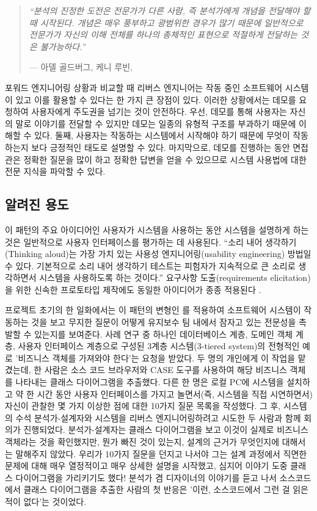 \documentclass[a4paper,10pt,twoside]{book}
\begin{document}
\begin{quotation}
\noindent
\emph{``분석의 진정한 도전은 전문가가 다른 사람, 즉 분석가에게 개념을 전달해야 할 때 시작된다. 개념은 매우 풍부하고 광범위한 경우가 많기 때문에 일반적으로 전문가가 자신의 이해 전체를 하나의 총체적인 표현으로 적절하게 전달하는 것은 불가능하다.''}

\hfill --- 아델 골드버그, 케니 루빈, \cite{Gold95a}
\end{quotation}

포워드 엔지니어링 상황과 비교할 때 리버스 엔지니어는 작동 중인 소프트웨어 시스템이 있고 이를 활용할 수 있다는 한 가지 큰 장점이 있다. 이러한 상황에서는 데모를 요청하여 사용자에게 주도권을 넘기는 것이 안전하다. 우선, 데모를 통해 사용자는 자신의 말로 이야기를 전달할 수 있지만 데모는 일종의 유형적 구조를 부과하기 때문에 이해할 수 있다. 둘째, 사용자는 작동하는 시스템에서 시작해야 하기 때문에 무엇이 작동하는지 보다 긍정적인 태도로 설명할 수 있다. 마지막으로, 데모를 진행하는 동안 면접관은 정확한 질문을 많이 하고 정확한 답변을 얻을 수 있으므로 시스템 사용법에 대한 전문 지식을 파악할 수 있다.

\subsection*{알려진 용도}

이 패턴의 주요 아이디어인 사용자가 시스템을 사용하는 동안 시스템을 설명하게 하는 것은 일반적으로 사용자 인터페이스를 평가하는 데 사용된다. ``소리 내어 생각하기(Thinking aloud)는 가장 가치 있는 사용성 엔지니어링(usability engineering) 방법일 수 있다. 기본적으로 소리 내어 생각하기 테스트는 피험자가 지속적으로 큰 소리로 생각하면서 시스템을 사용하도록 하는 것이다.'' \cite{Niel93b} 요구사항 도출(requirements elicitation)을 위한 신속한 프로토타입 제작에도 동일한 아이디어가 종종 적용된다 \cite{Somm96a}.

 프로젝트 초기의 한 일화에서는 이 패턴의 변형인 를 적용하여 소프트웨어 시스템이 작동하는 것을 보고 무지한 질문이 어떻게 유지보수 팀 내에서 잠자고 있는 전문성을 촉발할 수 있는지를 보여준다. 사례 연구 중 하나인 데이터베이스 계층, 도메인 객체 계층, 사용자 인터페이스 계층으로 구성된 3계층 시스템(3-tiered system)의 전형적인 예로 '비즈니스 객체를 가져와야 한다'는 요청을 받았다. 두 명의 개인에게 이 작업을 맡겼는데, 한 사람은 소스 코드 브라우저와 CASE 도구를 사용하여 해당 비즈니스 객체를 나타내는 클래스 다이어그램을 추출했다. 다른 한 명은 로컬 PC에 시스템을 설치하고 약 한 시간 동안 사용자 인터페이스를 가지고 놀면서(즉, 시스템을 직접 시연하면서) 자신이 관찰한 몇 가지 이상한 점에 대한 10가지 질문 목록을 작성했다. 그 후, 시스템의 수석 분석가-설계자와 시스템을 리버스 엔지니어링하려고 시도한 두 사람과 함께 회의가 진행되었다. 분석가-설계자는 클래스 다이어그램을 보고 이것이 실제로 비즈니스 객체라는 것을 확인했지만, 뭔가 빠진 것이 있는지, 설계의 근거가 무엇인지에 대해서는 말해주지 않았다. 우리가 10가지 질문을 던지고 나서야 그는 설계 과정에서 직면한 문제에 대해 매우 열정적이고 매우 상세한 설명을 시작했고, 심지어 이야기 도중 클래스 다이어그램을 가리키기도 했다! 분석가 겸 디자이너의 이야기를 듣고 나서 소스코드에서 클래스 다이어그램을 추출한 사람의 첫 반응은 '이런, 소스코드에서 그런 걸 읽은 적이 없다'는 것이었다.
\end{document}
